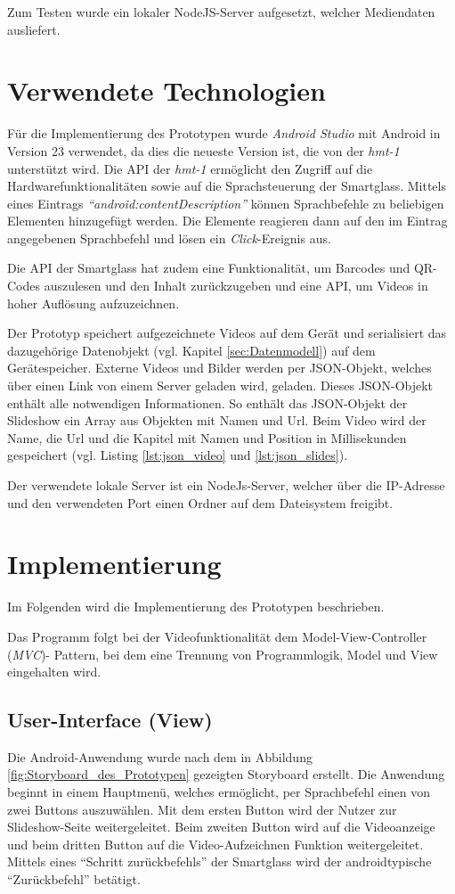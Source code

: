 Zum Testen wurde ein lokaler NodeJS-Server aufgesetzt, welcher Mediendaten ausliefert.
%
%
%
%
%
%
\section{Verwendete Technologien}
\label{sec:Verwendete_Technologien}
Für die Implementierung des Prototypen wurde \emph{Android Studio} mit Android in Version 23 verwendet, da dies die neueste Version ist, die von der \emph{hmt-1} unterstützt wird. Die API der \emph{hmt-1} ermöglicht den Zugriff auf die Hardwarefunktionalitäten sowie auf die Sprachsteuerung der Smartglass. Mittels eines Eintrags \emph{\enquote{android:contentDescription}} können Sprachbefehle zu beliebigen Elementen hinzugefügt werden. Die Elemente reagieren dann auf den im Eintrag angegebenen Sprachbefehl und lösen ein \emph{Click}-Ereignis aus.

Die API der Smartglass hat zudem eine Funktionalität, um Barcodes und QR-Codes auszulesen und den Inhalt zurückzugeben und eine API, um Videos in hoher Auflösung aufzuzeichnen. 

Der Prototyp speichert aufgezeichnete Videos auf dem Gerät und serialisiert das dazugehörige Datenobjekt (vgl. Kapitel \ref{sec:Datenmodell}) auf dem Gerätespeicher. Externe Videos und Bilder werden per JSON-Objekt, welches über einen Link von einem Server geladen wird, geladen. Dieses JSON-Objekt enthält alle notwendigen Informationen. So enthält das JSON-Objekt der Slideshow ein Array aus Objekten mit Namen und Url. Beim Video wird der Name, die Url und die Kapitel mit Namen und Position in Millisekunden gespeichert (vgl. Listing \ref{lst:json_video} und \ref{lst:json_slides}).

Der verwendete lokale Server ist ein NodeJs-Server, welcher über die IP-Adresse und den verwendeten Port einen Ordner auf dem Dateisystem freigibt.
%
%
%
%
%
%
\section{Implementierung}
\label{sec:Implementation}
Im Folgenden wird die Implementierung des Prototypen beschrieben. 

Das Programm folgt bei der Videofunktionalität dem Model-View-Controller (\emph{MVC})- Pattern, bei dem eine Trennung von Programmlogik, Model und View eingehalten wird.
%
%
%
%
%
%
\subsection{User-Interface (View)}
Die Android-Anwendung wurde nach dem in Abbildung \ref{fig:Storyboard_des_Prototypen} gezeigten Storyboard erstellt. Die Anwendung beginnt in einem Hauptmenü, welches ermöglicht, per Sprachbefehl einen von zwei Buttons auszuwählen. Mit dem ersten Button wird der Nutzer zur Slideshow-Seite weitergeleitet. Beim zweiten Button wird auf die Videoanzeige und beim dritten Button auf die Video-Aufzeichnen Funktion weitergeleitet. Mittels eines \enquote{Schritt zurückbefehls} der Smartglass wird der androidtypische \enquote{Zurückbefehl} betätigt.

